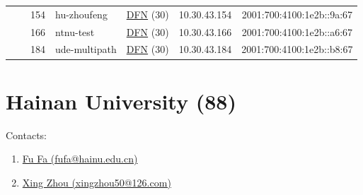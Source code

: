 \begin{small}
\begin{center}
\begin{longtable}{|c|c|c|c|c|c|c|c|}
  &  & \tiny{154} & \multicolumn{1}{|l|}{\tiny{hu-zhoufeng}} & \multicolumn{2}{|c|}{\tiny{\href{https://www.dfn.de}{DFN} (30)}} & \tiny{10.30.43.154} & \tiny{2001:700:4100:1e2b::9a:67} \\* \cline{3-3}\cline{4-4}\cline{5-5}\cline{6-6}\cline{7-7}\cline{8-8}
  &  & \tiny{166} & \multicolumn{1}{|l|}{\tiny{ntnu-test}} & \multicolumn{2}{|c|}{\tiny{\href{https://www.dfn.de}{DFN} (30)}} & \tiny{10.30.43.166} & \tiny{2001:700:4100:1e2b::a6:67} \\* \cline{3-3}\cline{4-4}\cline{5-5}\cline{6-6}\cline{7-7}\cline{8-8}
  &  & \tiny{184} & \multicolumn{1}{|l|}{\tiny{ude-multipath}} & \multicolumn{2}{|c|}{\tiny{\href{https://www.dfn.de}{DFN} (30)}} & \tiny{10.30.43.184} & \tiny{2001:700:4100:1e2b::b8:67} \\ \hline
\end{longtable}
\end{center}
\end{small}



\section{Hainan University (88)}
\label{sec:HU}

Contacts:\begin{enumerate}
 \item {}\href{mailto:fufa@hainu.edu.cn}{Fu Fa (fufa@hainu.edu.cn)}
 \item {}\href{mailto:xingzhou50@126.com}{Xing Zhou (xingzhou50@126.com)}
\end{enumerate}

